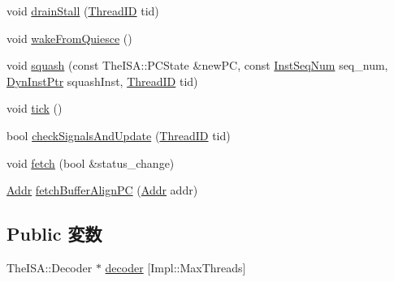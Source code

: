 \begin{DoxyCompactItemize}
\item 
void \hyperlink{classDefaultFetch_ad1c01dde67aa909bd829896f6f587502}{drainStall} (\hyperlink{base_2types_8hh_ab39b1a4f9dad884694c7a74ed69e6a6b}{ThreadID} tid)
\item 
void \hyperlink{classDefaultFetch_a040cbeac7187b0b8cdb1242d3f5aa179}{wakeFromQuiesce} ()
\item 
void \hyperlink{classDefaultFetch_ae16ceb7406a5afe4ea9a39fd12931d32}{squash} (const TheISA::PCState \&newPC, const \hyperlink{inst__seq_8hh_a258d93d98edaedee089435c19ea2ea2e}{InstSeqNum} seq\_\-num, \hyperlink{classDefaultFetch_a028ce10889c5f6450239d9e9a7347976}{DynInstPtr} squashInst, \hyperlink{base_2types_8hh_ab39b1a4f9dad884694c7a74ed69e6a6b}{ThreadID} tid)
\item 
void \hyperlink{classDefaultFetch_a873dd91783f9efb4a590aded1f70d6b0}{tick} ()
\item 
bool \hyperlink{classDefaultFetch_af77f2bf38a75182c65e633b9fdf295d2}{checkSignalsAndUpdate} (\hyperlink{base_2types_8hh_ab39b1a4f9dad884694c7a74ed69e6a6b}{ThreadID} tid)
\item 
void \hyperlink{classDefaultFetch_a77759cf15b084e00a9e4e8ca810a0be7}{fetch} (bool \&status\_\-change)
\item 
\hyperlink{base_2types_8hh_af1bb03d6a4ee096394a6749f0a169232}{Addr} \hyperlink{classDefaultFetch_a0c451948a0050595e5d23f57866f2797}{fetchBufferAlignPC} (\hyperlink{base_2types_8hh_af1bb03d6a4ee096394a6749f0a169232}{Addr} addr)
\end{DoxyCompactItemize}
\subsection*{Public 変数}
\begin{DoxyCompactItemize}
\item 
TheISA::Decoder $\ast$ \hyperlink{classDefaultFetch_ad59085cbedffbd5bf8cd9eb714041505}{decoder} \mbox{[}Impl::MaxThreads\mbox{]}
\end{DoxyCompactItemize}
